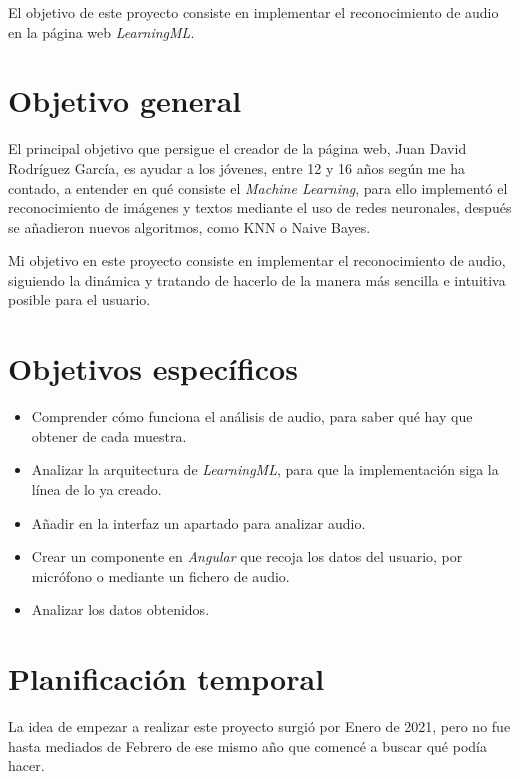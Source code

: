 \documentclass[a4paper, 12pt]{book}
\begin{document}
El objetivo de este proyecto consiste en implementar el reconocimiento de audio en la página web \textit{LearningML}.

\section{Objetivo general} %
\label{sec:objetivo-general} %

El principal objetivo que persigue el creador de la página web, Juan David Rodríguez García, es ayudar a los jóvenes, entre 12 y 16 años según me ha contado, a entender en qué consiste el \textit{Machine Learning}, para ello implementó el reconocimiento de imágenes y textos mediante el uso de redes neuronales, después se añadieron nuevos algoritmos, como KNN o Naive Bayes.

Mi objetivo en este proyecto consiste en implementar el reconocimiento de audio, siguiendo la dinámica y tratando de hacerlo de la manera más sencilla e intuitiva posible para el usuario.

\section{Objetivos específicos}
\label{sec:objetivos-especificos}

\begin{itemize}

  \item Comprender cómo funciona el análisis de audio, para saber qué hay que obtener de cada muestra.
  \item Analizar la arquitectura de \textit{LearningML}, para que la implementación siga la línea de lo ya creado.
  \item Añadir en la interfaz un apartado para analizar audio.
  \item Crear un componente en \textit{Angular} que recoja los datos del usuario, por micrófono o mediante un fichero de audio.
  \item Analizar los datos obtenidos.

\end{itemize}


\section{Planificación temporal}
\label{sec:planificacion-temporal}

La idea de empezar a realizar este proyecto surgió por Enero de 2021, pero no fue hasta mediados de Febrero de ese mismo año que comencé a buscar qué podía hacer.
\end{document}
